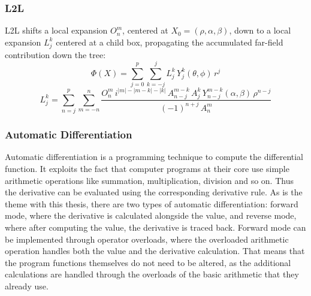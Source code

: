 
\subsubsection{L2L}
L2L shifts a local expansion $O_n^m$, centered at $X_0=(\rho,\alpha,\beta)$, down to a local expansion $L_j^k$ centered at a child box, propagating the accumulated far-field contribution down the tree:
\begin{equation}
    \Phi(X) = \sum_{j=0}^{p}\sum_{k=-j}^{j} L_j^k \, Y_j^k(\theta,\phi) \, r^j
    \label{eq:l2l-potential}
\end{equation}
\begin{equation}
    L_j^k = \sum_{n=j}^{p}\sum_{m=-n}^{n} \frac{O_n^m \, i^{|m|-|m-k|-|k|} \, A_{n-j}^{m-k} \, A_j^k \, Y_{n-j}^{m-k}(\alpha,\beta) \, \rho^{n-j}}{(-1)^{n+j} \, A_n^m}
    \label{eq:l2l-coeffs}
\end{equation}

\subsubsection{Automatic Differentiation}

Automatic differentiation is a programming technique to compute the differential function.
It exploits the fact that computer programs at their core use simple arithmetic operations like summation, multiplication, division and so on.
Thus the derivative can be evaluated using the corresponding derivative rule.
As is the theme with this thesis, there are two types of automatic differentiation: forward mode, where the derivative is calculated alongside the value, and reverse mode, where 
after computing the value, the derivative is traced back.
Forward mode can be implemented through operator overloads, where the overloaded arithmetic operation handles both the value and the derivative calculation.
That means that the program functions themselves do not need to be altered, as the additional calculations are handled through the overloads of the basic arithmetic that they already use.

